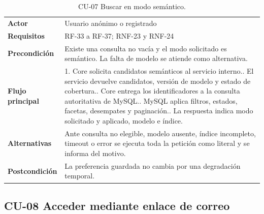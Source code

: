 \begin{table}[H]
\centering
\begin{tabularx}{\textwidth}{p{}X}
\toprule
\textbf{Actor} & Usuario anónimo o registrado\\
\textbf{Requisitos} & RF-33 a RF-37; RNF-23 y RNF-24\\
\textbf{Precondición} & Existe una consulta no vacía y el modo solicitado es semántico. La falta de modelo se atiende como alternativa.\\
\textbf{Flujo principal} & 1. Core solicita candidatos semánticos al servicio interno.\newline
2. El servicio devuelve candidatos, versión de modelo y estado de cobertura.\newline
3. Core entrega los identificadores a la consulta autoritativa de MySQL.\newline
4. MySQL aplica filtros, estados, facetas, desempates y paginación.\newline
5. La respuesta indica modo solicitado y aplicado, modelo e índice.\\
\textbf{Alternativas} & Ante consulta no elegible, modelo ausente, índice incompleto, timeout o error se ejecuta toda la petición como literal y se informa del motivo.\\
\textbf{Postcondición} & La preferencia guardada no cambia por una degradación temporal.\\
\bottomrule
\end{tabularx}
\caption{CU-07 Buscar en modo semántico.}
\label{tabla:cu-busqueda-semantica}
\end{table}

\subsection{CU-08 Acceder mediante enlace de correo}

